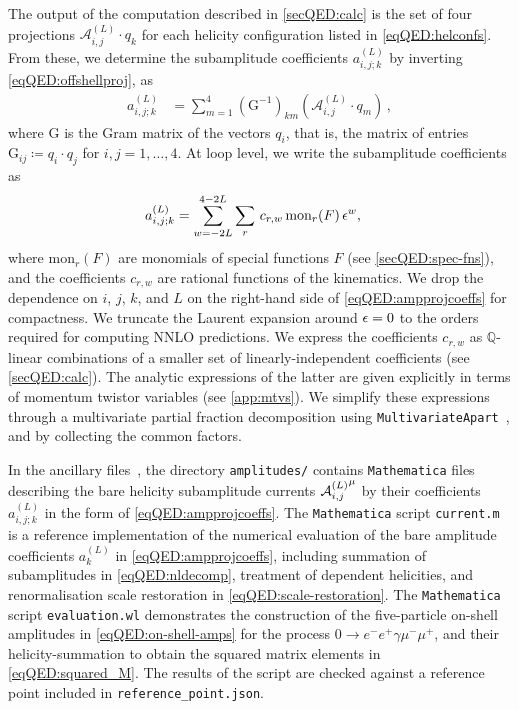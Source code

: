 \documentclass[main.tex]{subfiles}
\begin{document}
The output of the computation described in \cref{secQED:calc} is the set of four projections $\mathcal{A}^{(L)}_{i,j} \cdot q_k$ for each helicity configuration listed in \cref{eqQED:helconfs}.
From these, we determine the subamplitude coefficients $a_{i,j;k}^{(L)}$ by inverting \cref{eqQED:offshellproj}, as
\begin{align}
    \label{eqQED:ampcoeffinv}
    a_{i,j ; k}^{(L)} &= \sum_{m=1}^4 \left(\mathrm{G}^{-1}\right)_{km} \left(\mathcal{A}^{(L)}_{i,j} \cdot q_m\right) \,,
\end{align}
where $\mathrm{G}$ is the Gram matrix of the vectors $q_i$, that is, the matrix of entries $\mathrm{G}_{ij} \coloneqq q_i \cdot q_j$ for $i,j=1,\ldots,4$.
At loop level, we write the subamplitude coefficients as
\begin{align}
    \label{eqQED:ampprojcoeffs}
    a_{i,j;k}^{(L)} &= \sum_{w=-2L}^{4-2L} \sum_r\,c_{r,w}\,\text{mon}_r(F)\,\epsilon^w ,
\end{align}
where $\text{mon}_r(F)$ are monomials of special functions $F$ (see \cref{secQED:spec-fns}), and the coefficients $c_{r,w}$ are rational functions of the kinematics. 
We drop the dependence on $i$, $j$, $k$, and $L$ on the right-hand side of \cref{eqQED:ampprojcoeffs} for compactness. 
We truncate the Laurent expansion around $\epsilon=0$ to the orders required for computing \ac{NNLO} predictions.
We express the coefficients $c_{r,w}$ as $\mathbb{Q}$-linear combinations of a smaller set of linearly-independent coefficients (see \cref{secQED:calc}).
The analytic expressions of the latter are given explicitly in terms of momentum twistor variables (see \cref{app:mtvs}).
We simplify these expressions through a multivariate partial fraction decomposition using \texttt{MultivariateApart}~\cite{Heller:2021qkz}, and by collecting the common factors.

In the ancillary files~\cite{zenodo}, the directory \texttt{amplitudes/} contains \texttt{Mathematica} files describing the bare helicity subamplitude currents ${\mathcal{A}^{(L)}_{i, j}}^{\mu}$ by their coefficients $a_{i,j;k}^{(L)}$ in the form of \cref{eqQED:ampprojcoeffs}.
The \texttt{Mathematica} script \texttt{current.m} is a reference implementation of the numerical evaluation of the bare amplitude coefficients $a_k^{(L)}$ in \cref{eqQED:ampprojcoeffs}, including summation of subamplitudes in \cref{eqQED:nldecomp}, treatment of dependent helicities, and renormalisation scale restoration in \cref{eqQED:scale-restoration}.
The \texttt{Mathematica} script \texttt{evaluation.wl} demonstrates the construction of the five-particle on-shell amplitudes in \cref{eqQED:on-shell-amps} for the process $0\to e^- e^+ \gamma \mu^- \mu^+$, and their helicity-summation to obtain the squared matrix elements in \cref{eqQED:squared_M}.
The results of the script are checked against a reference point included in \texttt{reference\_point.json}.
\end{document}
